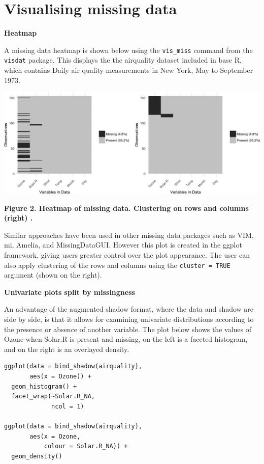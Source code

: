 \documentclass[]{article}
\begin{document}
\section{Visualising missing data}\label{visualising-missing-data}

\textbf{Heatmap}

A missing data heatmap is shown below using the \texttt{vis\_miss}
command from the \texttt{visdat} package. This displays the the
airquality dataset included in base R, which contains Daily air quality
measurements in New York, May to September 1973.

\includegraphics{jsm2017_njtierney_files/figure-latex/unnamed-chunk-1-1.png}

\textbf{Figure 2. Heatmap of missing data. Clustering on rows and
columns (right) .}

Similar approaches have been used in other missing data packages such as
VIM, mi, Amelia, and MissingDataGUI. However this plot is created in the
ggplot framework, giving users greater control over the plot appearance.
The user can also apply clustering of the rows and columns using the
\texttt{cluster\ =\ TRUE} argument (shown on the right).

\textbf{Univariate plots split by missingness}

An advantage of the augmented shadow format, where the data and shadow
are side by side, is that it allows for examining univariate
distributions according to the presence or absence of another variable.
The plot below shows the values of Ozone when Solar.R is present and
missing, on the left is a faceted histogram, and on the right is an
overlayed density.

\begin{verbatim}
ggplot(data = bind_shadow(airquality),
       aes(x = Ozone)) + 
  geom_histogram() + 
  facet_wrap(~Solar.R_NA,
             ncol = 1)

ggplot(data = bind_shadow(airquality),
       aes(x = Ozone,
           colour = Solar.R_NA)) + 
  geom_density()
\end{verbatim}
\end{document}
